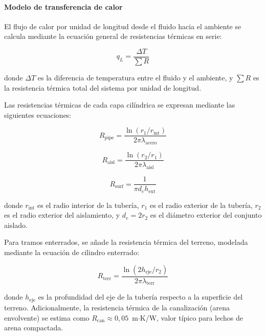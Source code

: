 \documentclass[12pt]{article}
\begin{document}
\paragraph{Modelo de transferencia de calor}
\label{par:modelo_transferencia}

El flujo de calor por unidad de longitud desde el fluido hacia el ambiente se calcula mediante la ecuación general de resistencias térmicas en serie:

\begin{equation}
	q_L = \frac{\Delta T}{\sum R}
	\label{eq:perdida_lineal_aisl}
\end{equation}

\noindent donde $\Delta T$ es la diferencia de temperatura entre el fluido y el ambiente, y $\sum R$ es la resistencia térmica total del sistema por unidad de longitud.

Las resistencias térmicas de cada capa cilíndrica se expresan mediante las siguientes ecuaciones:

\begin{equation}
	R_{\text{pipe}} = \frac{\ln(r_1 / r_{\text{int}})}{2\pi \lambda_{\text{acero}}}
	\label{eq:resist_tuberia}
\end{equation}

\begin{equation}
	R_{\text{aisl}} = \frac{\ln(r_2 / r_1)}{2\pi \lambda_{\text{aisl}}}
	\label{eq:resist_aislamiento}
\end{equation}

\begin{equation}
	R_{\text{surf}} = \frac{1}{\pi d_e h_{\text{ext}}}
	\label{eq:resist_superficie}
\end{equation}

\noindent donde $r_{\text{int}}$ es el radio interior de la tubería, $r_1$ es el radio exterior de la tubería, $r_2$ es el radio exterior del aislamiento, y $d_e = 2r_2$ es el diámetro exterior del conjunto aislado.

Para tramos enterrados, se añade la resistencia térmica del terreno, modelada mediante la ecuación de cilindro enterrado:

\begin{equation}
	R_{\text{terr}} = \frac{\ln(2 h_{\text{eje}} / r_2)}{2\pi \lambda_{\text{terr}}}
	\label{eq:resist_terreno}
\end{equation}

\noindent donde $h_{\text{eje}}$ es la profundidad del eje de la tubería respecto a la superficie del terreno. Adicionalmente, la resistencia térmica de la canalización (arena envolvente) se estima como $R_{\text{can}} \approx 0{,}05$~m$\cdot$K/W, valor típico para lechos de arena compactada.
\end{document}

